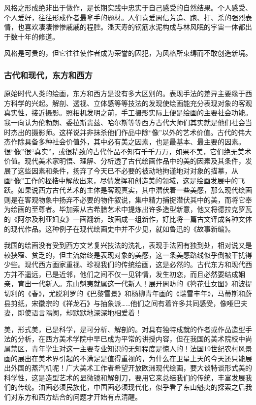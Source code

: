 \documentclass{article}
\begin{document}
风格之形成绝非出于做作，是长期实践中忠实于自己感受的自然结果。个人感受、个人爱好，往往形成作者最拿手的题材。人们喜爱周信芳追、跑、打、杀的强烈表情，也喜欢凄凄惨惨戚戚的程腔。潘天寿的钢筋水泥构成与林风眠的宇宙一体都出于数十年的修道。

风格是可贵的，但它往往使作者成为荣誉的囚犯，为风格所束缚而不敢创造新境。
\subsubsection{古代和现代，东方和西方}
原始时代人类的绘画，东方和西方是没有多大区别的。表现手法的差异主要缘于西方科学的兴起。解剖、透视、立体感等等技法的发现使绘画能充分表现对象的客观真实性，接近摄影。照相机发明之前，手工摄影实际上便是绘画的主要社会功能。我一向认为伦勃朗、委拉斯贵兹、哈尔斯等等西方古代大师们其实就是他们社会当时杰出的摄影师。这样说并非抹杀他们作品中除“像”以外的艺术价值。古代的伟大杰作除具备多种社会价值外，其中必有美之因素，也是最基本、最主要的因素。很“像”很“真实”，或很精致的古代作品不知有千千万万，如果不美，它们绝无美术价值。现代美术家明悟、理解、分析透了古代绘画作品中的美的因素及其条件，发展了这些因素和条件，扬弃了今天已不必要的被动地拘谨地对对象的描摹，从画“像”工作的桎梏中解放出来，尽情发挥和创造美的领域，这是绘画发展中的飞跃。如果说西方古代艺术的主体是客观真实，其中潜伏着一些美感，那么现代绘画则是在客观物象中扬弃不必要的物件叙说，集中精力捕捉潜伏其中的美，而将它奉为绘画的至尊者。毕加索从古希腊艺术中提炼出许多造型新意，他又将德拉克罗瓦的《阿尔及利亚妇女》一画翻新，改画成一组新作，好比将一篇古文译成各种文体的现代作品。这种例子在现代绘画史中并不少见，就如鲁迅的《故事新编》。

我国的绘画没有受到西方文艺复兴技法的洗礼，表现手法固有独到处，相对说又是较狭窄、贫乏的，但主流始终是表现对象的美感，这一条美感路线似乎倒被干扰得少些。现代西方画家重视、珍视我们的传统绘画，这是必然的。古代东方和现代西方并不遥远，已是近邻，他们之间不仅一见钟情，发生初恋，而且必然要结成姻亲，育出一代新人。东山魁夷就属这一代新人！展开周昉的《簪花仕女图》和波提切利的《春》，尤脱利罗的《巴黎雪景》和杨柳青年画的《瑞雪丰年》，马蒂斯和蔚县剪纸，宋徽宗的《祥龙石》与抽象派……他们之间有着许多共同感受，像哑巴夫妻，即使语言隔阂，却默默地深深地相爱着！

美，形式美，已是科学，是可分析、解剖的。对具有独特成就的作者或作品造型手法的分析，在西方美术学院中早已成为平常的讲授内容，但在我国的美术院校中尚属禁区，青年学生对这一主要专业知识的无知程度是惊人的！法国19世纪农村风景画的展出在美术界引起的不满足是值得重视的，为什么在卫星上天的今天还只能展出外国的蒸汽机呢！广大美术工作者希望开放欧洲现代绘画，要大谈特谈形式美的科学性，这是造型艺术的显微镜和解剖刀，要用它来总结我们的传统，丰富发展我们的传统。油画必须民族化，中国画必须现代化，似乎看了东山魁夷的探索之后我们对东方和西方结合的问题才开始有点清醒。
\end{document}
